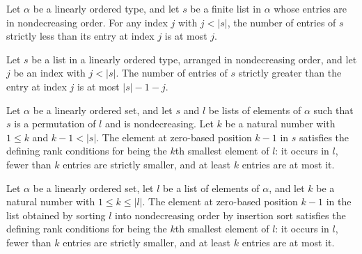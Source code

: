 \begin{lemma}
\label{Randomized.countP_lt_getElem_le}
\leanok
{}
Let $\alpha$ be a linearly ordered type, and let $s$ be a finite list in $\alpha$ whose
entries are in nondecreasing order. For any index $j$ with $j<|s|$, the number of
entries of $s$ strictly less than its entry at index $j$ is at most $j$.
\end{lemma}

\begin{lemma}
\label{Randomized.countP_getElem_lt_le}
\leanok
{}
Let $s$ be a list in a linearly ordered type, arranged in nondecreasing order, and let
$j$ be an index with $j<|s|$. The number of entries of $s$ strictly greater than the
entry at index $j$ is at most $|s|-1-j$.
\end{lemma}

\begin{lemma}
\label{Randomized.isKthSmallest_of_sorted}
\leanok
{}
Let $\alpha$ be a linearly ordered set, and let $s$ and $l$ be lists of elements of
$\alpha$ such that $s$ is a permutation of $l$ and is nondecreasing. Let $k$ be a
natural number with $1\le k$ and $k-1<|s|$. The element at zero-based position $k-1$ in
$s$ satisfies the defining rank conditions for being the $k$th smallest element of $l$:
it occurs in $l$, fewer than $k$ entries are strictly smaller, and at least $k$ entries
are at most it.
\end{lemma}

\begin{theorem}
\label{Randomized.isKthSmallest_insertionSort}
\leanok
{}
Let $\alpha$ be a linearly ordered set, let $l$ be a list of elements of $\alpha$, and
let $k$ be a natural number with $1\le k\le |l|$. The element at zero-based position
$k-1$ in the list obtained by sorting $l$ into nondecreasing order by insertion sort
satisfies the defining rank conditions for being the $k$th smallest element of $l$: it
occurs in $l$, fewer than $k$ entries are strictly smaller, and at least $k$ entries are
at most it.
\end{theorem}

